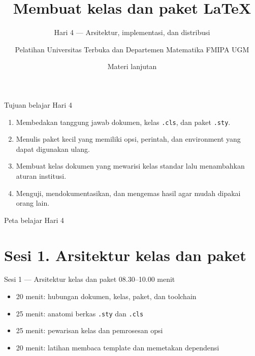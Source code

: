 \documentclass[aspectratio=169,11pt]{beamer}
\title{Membuat kelas dan paket \LaTeX}
\subtitle{Hari 4 --- Arsitektur, implementasi, dan distribusi}
\author{Pelatihan Universitas Terbuka dan Departemen Matematika FMIPA UGM}
\date{Materi lanjutan}
\begin{document}
\begin{frame}[plain]
\inserttitle\par
{}\insertsubtitle\par\medskip
{}\par\medskip
{}\insertauthor\par\smallskip
{}\insertdate
\end{frame}

\begin{frame}{Tujuan belajar Hari 4}
\begin{enumerate}
  \item Membedakan tanggung jawab dokumen, kelas \texttt{.cls}, dan paket \texttt{.sty}.
  \item Menulis paket kecil yang memiliki opsi, perintah, dan environment yang dapat digunakan ulang.
  \item Membuat kelas dokumen yang mewarisi kelas standar lalu menambahkan aturan institusi.
  \item Menguji, mendokumentasikan, dan mengemas hasil agar mudah dipakai orang lain.
\end{enumerate}
\end{frame}

\begin{frame}{Peta belajar Hari 4}
\tableofcontents
\end{frame}

\section{Sesi 1. Arsitektur kelas dan paket}

\begin{frame}{Sesi 1 --- Arsitektur kelas dan paket}
\large 08.30--10.00  menit
\medskip
\begin{itemize}
  \item 20 menit: hubungan dokumen, kelas, paket, dan toolchain
  \item 25 menit: anatomi berkas \texttt{.sty} dan \texttt{.cls}
  \item 25 menit: pewarisan kelas dan pemrosesan opsi
  \item 20 menit: latihan membaca template dan memetakan dependensi
\end{itemize}
\end{frame}
\end{document}
